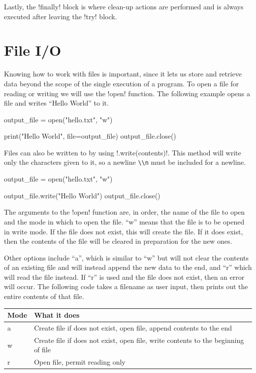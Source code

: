 \documentclass[11pt]{cselabheader}
\begin{document}
Lastly, the \pythoninline!finally! block is where clean-up actions are performed and is always executed after leaving the \pythoninline!try! block.
\section{File I/O}
Knowing how to work with files is important, since it lets us store and retrieve
data beyond the scope of the single execution of a program. To open a file for
reading or writing we will use the \pythoninline!open! function. The following
example opens a file and writes ``Hello World'' to it.

\begin{python3code}
output_file = open("hello.txt", "w")

print("Hello World", file=output_file)
output_file.close()
\end{python3code}

Files can also be written to by using \pythoninline!.write(contents)!. This method will write only the characters given to it, so a newline \lstinline{\\n} must be included for a newline.

\begin{python3code}
output_file = open("hello.txt", "w")

output_file.write("Hello World\n")
output_file.close()
\end{python3code}

The arguments to the \pythoninline!open! function are, in order, the name of the
file to open and the mode in which to open the file. ``w'' means that the file
is to be opened in write mode. If the file does not exist, this will create the
file. If it does exist, then the contents of the file will be cleared in
preparation for the new ones.

Other options include ``a'', which is similar to ``w'' but will not clear the
contents of an existing file and will instead append the new data to the end,
and ``r'' which will read the file instead. If ``r'' is used and the file does
not exist, then an error will occur. The following code takes a filename as user
input, then prints out the entire contents of that file.

\begin{table}[!ht]
  \centering
  \begin{tabular}{ll}
    Mode & What it does \\
    \midrule
    a & Create file if does not exist, open file, append contents to the end \\
    w & Create file if does not exist, open file, write contents to the beginning
    of file \\
    r & Open file, permit reading only \\
  \end{tabular}
\end{table}
\end{document}
